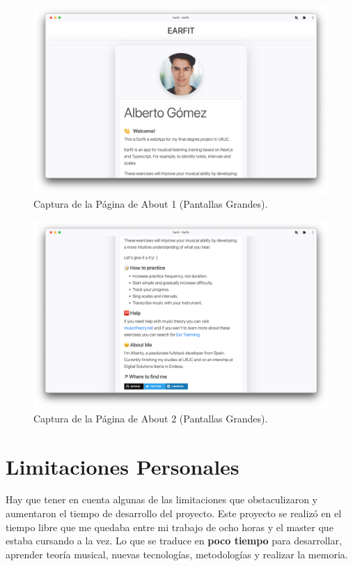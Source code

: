 \documentclass[12pt,twoside,titlepage]{report}
\begin{document}
\begin{figure}[H]
    \centering
    \includegraphics[scale=0.28]{Capturas Earfit/PC/About1}
    \caption{Captura de la Página de About 1 (Pantallas Grandes).}
    \label{fig:PCAbout1}
\end{figure}

\begin{figure}[H]
    \centering
    \includegraphics[scale=0.28]{Capturas Earfit/PC/About2}
    \caption{Captura de la Página de About 2 (Pantallas Grandes).}
    \label{fig:PCAbout2}
\end{figure}


\chapter{Limitaciones Personales}

Hay que tener en cuenta algunas de las limitaciones que obstaculizaron y aumentaron el tiempo de desarrollo del proyecto. Este proyecto se realizó en el tiempo libre que me quedaba entre mi trabajo de ocho horas y el master que estaba cursando a la vez. Lo que se traduce en \textbf{poco tiempo} para desarrollar, aprender teoría musical, nuevas tecnologías, metodologías y realizar la memoria. 
\end{document}
